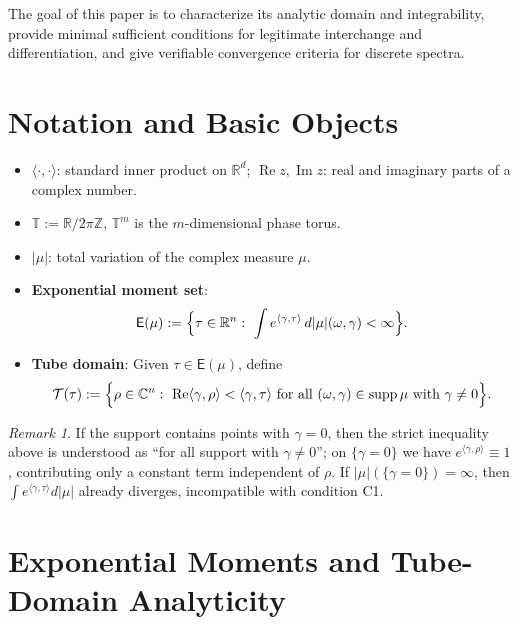 \documentclass[11pt,a4paper]{article}
\theoremstyle{remark}
\newtheorem{remark}[theorem]{Remark}
\DeclareMathOperator{\Re}{Re}
\DeclareMathOperator{\Im}{Im}
\DeclareMathOperator{\supp}{supp}
\begin{document}
The goal of this paper is to characterize its analytic domain and integrability, provide minimal sufficient conditions for legitimate interchange and differentiation, and give verifiable convergence criteria for discrete spectra.

\section{Notation and Basic Objects}

\begin{itemize}
\item $\langle\cdot,\cdot\rangle$: standard inner product on $\mathbb{R}^d$; $\Re z,\Im z$: real and imaginary parts of a complex number.
\item $\mathbb{T}:=\mathbb{R}/2\pi\mathbb{Z}$, $\mathbb{T}^m$ is the $m$-dimensional phase torus.
\item $|\mu|$: total variation of the complex measure $\mu$.
\item \textbf{Exponential moment set}:
\begin{equation}
\mathsf{E}(\mu):=\Bigl\{\tau\in\mathbb{R}^n:\ \int e^{\langle\gamma,\tau\rangle}\,d|\mu|(\omega,\gamma)<\infty\Bigr\}.
\end{equation}
\item \textbf{Tube domain}: Given $\tau\in\mathsf{E}(\mu)$, define
\begin{equation}
\mathcal{T}(\tau):=\Bigl\{\rho\in\mathbb{C}^n:\ \Re\langle\gamma,\rho\rangle < \langle\gamma,\tau\rangle\ \text{for all }(\omega,\gamma)\in\supp\mu\text{ with }\gamma\ne 0\Bigr\}.
\end{equation}
\end{itemize}

\begin{remark}
If the support contains points with $\gamma=0$, then the strict inequality above is understood as ``for all support with $\gamma\ne 0$''; on $\{\gamma=0\}$ we have $e^{\langle\gamma,\rho\rangle}\equiv1$, contributing only a constant term independent of $\rho$. If $|\mu|(\{\gamma=0\})=\infty$, then $\int e^{\langle\gamma,\tau\rangle}d|\mu|$ already diverges, incompatible with condition C1.
\end{remark}

\section{Exponential Moments and Tube-Domain Analyticity}
\end{document}
